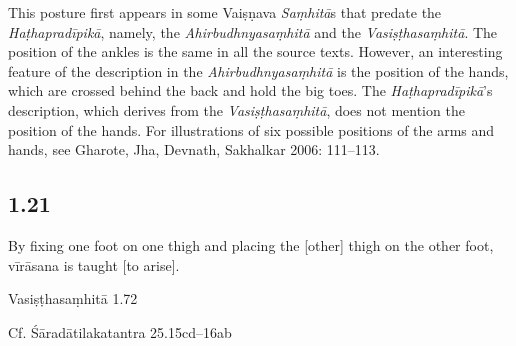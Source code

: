 \begin{ekdosis}
\begin{testimonia}[hp01_020]
\begin{versinnote}
\end{versinnote}

\end{testimonia}

\begin{philcomm}[hp01_020]        
This posture first appears in some Vaiṣṇava \emph{Saṃhitā}s that predate the \emph{Haṭhapradīpikā}, namely, the \emph{Ahirbudhnyasaṃhitā} and the \emph{Vasiṣṭhasaṃhitā}. The position of the ankles is the same in all the source texts. However, an interesting feature of the description in the \emph{Ahirbudhnyasaṃhitā} is the position of the hands, which are crossed behind the back and hold the big toes. The \emph{Haṭhapradīpikā}’s description, which derives from the \emph{Vasiṣṭhasaṃhitā}, does not mention the position of the hands. For illustrations of six possible positions of the arms and hands, see Gharote, Jha, Devnath, Sakhalkar 2006: 111–113.
\end{philcomm}

\subsection*{1.21}
\begin{translation}[hp01_021]
By fixing one foot on one thigh and placing the [other] thigh on the other foot, vīrāsana is taught [to arise].
\end{translation}

\begin{sources}[hp01_021]
Vasiṣṭhasaṃhitā 1.72

\begin{versinnote}
\end{versinnote}

Cf. Śāradātilakatantra 25.15cd–16ab

\begin{versinnote}
\end{versinnote}


\end{sources}
\end{ekdosis}

